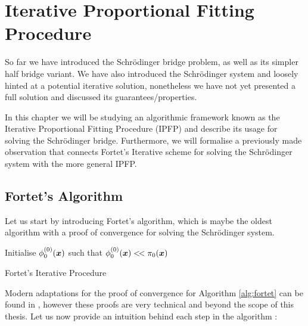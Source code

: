 \documentclass[a4paper,12pt,twoside,openright]{report}
\theoremstyle{definition}
\begin{document}
\chapter{Iterative Proportional Fitting Procedure}

So far we have introduced the Schrödinger bridge problem, as well as its simpler half bridge variant. We have also introduced the Schrödinger system and loosely hinted at a potential iterative solution, nonetheless we have not yet presented a full solution and discussed its guarantees/properties.

In this chapter we will be studying an algorithmic framework known as the Iterative Proportional Fitting Procedure (IPFP) \citep{csiszar1975divergence, kullback1968probability, ruschendorf1995convergence,cramer2000probability} and describe its usage for solving the Schrödinger bridge. Furthermore, we will formalise a previously made observation that connects Fortet's Iterative scheme \citep{fortet1940resolution} for solving the Schrödinger system with the more general IPFP. 

\section{Fortet's Algorithm}

Let us start by introducing Fortet's algorithm, which is maybe the oldest algorithm with a proof of convergence \citep{fortet1940resolution} for solving the Schrödinger system.

\begin{algorithm} \label{alg:fortet}
Initialise $\phi_0^{(0)}({\bm{x}})$ such that $\phi_0^{(0)}({\bm{x}}) <\!< \pi_0({\bm{x}})$ \\
\caption{Fortet's Iterative Procedure}
\end{algorithm}
Modern adaptations for the proof of convergence for Algorithm  \ref{alg:fortet} can be found in \citep{essid2019traversing, chen2016entropic}, however these proofs are very technical and beyond the scope of this thesis.  Let us now provide an intuition behind each step in the algorithm :
\end{document}
